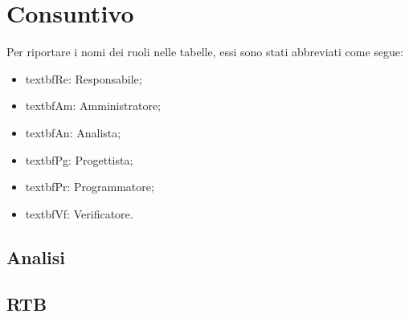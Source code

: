 \section{Consuntivo}

Per riportare i nomi dei ruoli nelle tabelle, essi sono stati abbreviati come segue:
\begin{itemize}
  \item textbf{Re:} Responsabile;
  \item textbf{Am:} Amministratore;
  \item textbf{An:} Analista;
  \item textbf{Pg:} Progettista;
  \item textbf{Pr:} Programmatore;
  \item textbf{Vf:} Verificatore.
\end{itemize}

\subsection{Analisi}


\subsection{RTB}







